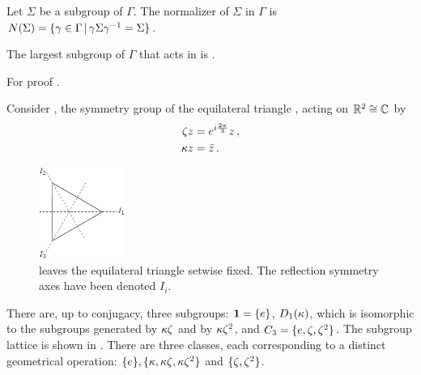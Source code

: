 \begin{definition}
 Let $\Sigma$ be a subgroup of $\Gamma$. The normalizer of $\Sigma$ in $\Gamma$ is
 $N(\Sigma)=\{\gamma\in\Gamma\, |\, \gamma\Sigma\gamma^{-1}=\Sigma\}$.
\end{definition}

\begin{lemma}
  The largest subgroup of $\Gamma$ that acts in \Fix{\Sigma} is \Nlz{\Sigma}.
  \label{lem:NlzActs}
\end{lemma}
For proof \cf {}.



\begin{example} %
Consider , the symmetry group of the equilateral triangle
, acting on $\mathbb{R}^{2}\cong\mathbb{C}^{}$ by
\begin{subequations}\label{eq:D3onR2}
\begin{align}	
  \zeta z &= e^{i\frac{2\pi}{3}} z\,,\\
  \kappa z  &= \bar{z}\,.
 \end{align}
\end{subequations}

\begin{figure}
\begin{center}
		\includegraphics[width=0.25\textwidth]{../figs/D3triangle}
\end{center}
\caption[D3 symmetry illustration]{
    {\small
     leaves the equilateral triangle setwise fixed.
    The reflection symmetry axes have been denoted $I_i$.}}
\label{fig:D3triangle}
    \vspace*{-5pt}
\end{figure}

There are, up to conjugacy, three subgroups: $\mathbf{1}=\{e\}$, $D_1(\kappa)$,
which is isomorphic to the subgroups generated
by $\kappa\zeta$ and by $\kappa\zeta^2$, and $C_{3}=\{e,\zeta,\zeta^2\}$.
The subgroup lattice is shown in .
There are three classes, each corresponding to
a distinct geometrical operation: $\{e\},\{\kappa,\kappa\zeta,\kappa\zeta^2\}$
and $\{\zeta,\zeta^2\}$.


\end{example}


